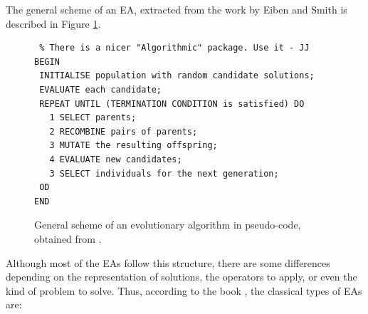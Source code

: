 \documentclass{article}
\begin{document}
The general scheme of an EA, extracted from the work by Eiben and Smith \cite{eiben2010whatis} is described in Figure \ref{fig:basicscheme}.  

\begin{figure}[tb]
\begin{verbatim} % There is a nicer "Algorithmic" package. Use it - JJ
BEGIN
 INITIALISE population with random candidate solutions;
 EVALUATE each candidate;
 REPEAT UNTIL (TERMINATION CONDITION is satisfied) DO
   1 SELECT parents;
   2 RECOMBINE pairs of parents;
   3 MUTATE the resulting offspring;
   4 EVALUATE new candidates;
   3 SELECT individuals for the next generation;
 OD
END
\end{verbatim}
\caption{General scheme of an evolutionary algorithm in pseudo-code, obtained from \cite{eiben2010whatis}.}
\label{fig:basicscheme}
\end{figure}

Although most of the EAs follow this structure, there are some differences depending on the representation of solutions, the operators to apply, or even the kind of problem to solve. Thus, according to the book \cite{eiben2003introduction}, the classical types  of EAs are:


\end{document}
